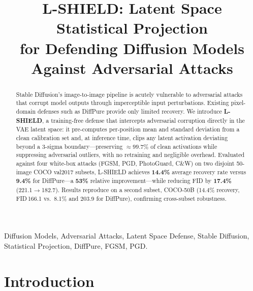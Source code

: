 \documentclass[conference]{IEEEtran}
\begin{document}
\title{L-SHIELD: Latent Space Statistical Projection\\for Defending Diffusion Models Against Adversarial Attacks}

\author{}

\maketitle

\begin{abstract}
Stable Diffusion's image-to-image pipeline is acutely vulnerable to adversarial
attacks that corrupt model outputs through imperceptible input perturbations.
Existing pixel-domain defenses such as DiffPure provide only limited recovery.
We introduce \textbf{L-SHIELD}, a training-free defense that intercepts
adversarial corruption directly in the VAE latent space: it pre-computes
per-position mean and standard deviation from a clean calibration set and, at
inference time, clips any latent activation deviating beyond a 3-sigma
boundary---preserving ${\approx}99.7\%$ of clean activations while suppressing
adversarial outliers, with no retraining and negligible overhead.
Evaluated against four white-box attacks (FGSM, PGD, PhotoGuard, C\&W) on
two disjoint 50-image COCO val2017 subsets, L-SHIELD achieves \textbf{14.4\%}
average recovery rate versus \textbf{9.4\%} for DiffPure---a \textbf{53\%}
relative improvement---while reducing FID by \textbf{17.4\%} (221.1$\to$182.7).
Results reproduce on a second subset, COCO-50B (14.4\% recovery, FID\,166.1
vs.\ 8.1\% and 203.9 for DiffPure), confirming cross-subset robustness.
\end{abstract}

\begin{IEEEkeywords}
Diffusion Models, Adversarial Attacks, Latent Space Defense, Stable Diffusion,
Statistical Projection, DiffPure, FGSM, PGD.
\end{IEEEkeywords}

\section{Introduction}
\end{document}
